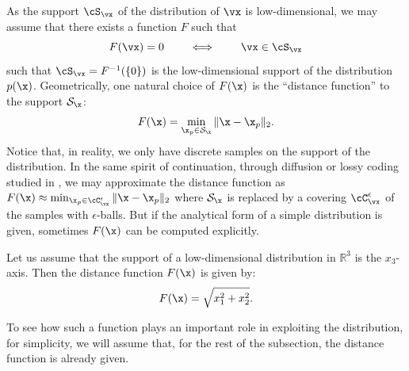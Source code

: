 \documentclass[../../book-main.tex]{subfiles}
\begin{document}
As the support \(\cS_{\vx}\) of the distribution of \(\vx\) is low-dimensional, we may assume that there exists a function \(F\) such that
\begin{equation}
  F(\vx) = {0} \qquad \iff \qquad \vx \in \cS_{\vx}
\end{equation}
such that \(\cS_{\vx} = F^{-1}(\{0\})\) is the low-dimensional support of the distribution $p(\x)$. Geometrically, one natural choice of $F(\x)$ is the ``distance function'' to the support $\mathcal{S}_{\x}$:
\begin{equation}
    F(\x) = \min_{\x_p \in \mathcal{S}_{\x}} \|\x - \x_p\|_2. 
    \label{eqn:F-definition}
\end{equation}
Notice that, in reality, we only have discrete samples on the support of the distribution. In the same spirit of continuation, through diffusion or lossy coding studied in , we may approximate the distance function as $F(\x) \approx \min_{\x_p \in \cC_{\vx}^{\epsilon}} \|\x - \x_p\|_2$ where $\mathcal{S}_{\x}$ is replaced by a covering \(\cC_{\vx}^{\epsilon}\) of the samples with $\epsilon$-balls. But if the analytical form of a simple distribution is given, sometimes $F(\x)$ can be computed explicitly. 
\begin{example}
Let us assume that the support of a low-dimensional  distribution in $\mathbb{R}^3$ is the $x_3$-axis. Then the distance function $F(\x)$ is given by:
\begin{equation}
    F(\x) = \sqrt{x_1^2 + x_2^2}. 
\end{equation}
\label{eg:distance-line}
\end{example}
To see how such a function plays an important role in exploiting the distribution, for simplicity, we will assume that, for the rest of the subsection, the distance function is already given.
\end{document}
